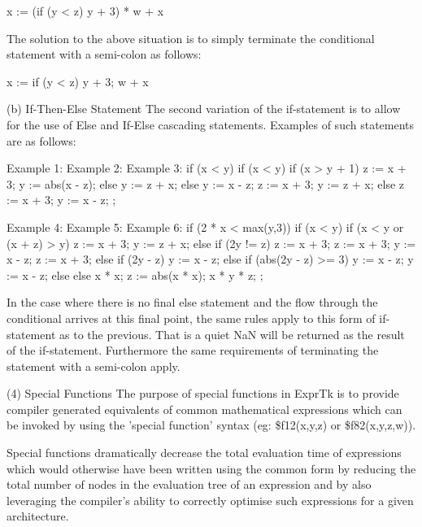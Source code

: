 x := (if (y < z) y + 3) * w + x


The  solution  to  the  above situation  is  to  simply  terminate the
conditional statement with a semi-colon as follows:

x := if (y < z) y + 3;
w + x


(b) If-Then-Else Statement
The second variation of  the if-statement is to  allow for the use  of
Else and If-Else cascading statements. Examples of such statements are
as follows:

Example 1:             Example 2:         Example 3:
if (x < y)             if (x < y)         if (x > y + 1)
z := x + 3;          {                    y := abs(x - z);
else                     y := z + x;      else
y := x - z;            z := x + 3;      {
}                    y := z + x;
else                 z := x + 3;
y := x - z;      };


Example 4:             Example 5:         Example 6:
if (2 * x < max(y,3))  if (x < y)         if (x < y or (x + z) > y)
{                        z := x + 3;      {
	y := z + x;          else if (2y != z)    z := x + 3;
	z := x + 3;          {                    y := x - z;
	}                        z := x + 3;      }
else if (2y - z)         y := x - z;      else if (abs(2y - z) >= 3)
y := x - z;          }                    y := x - z;
else               else
x * x;           {
z := abs(x * x);
x * y * z;
};


In  the case  where  there  is no  final else  statement and  the flow
through the conditional  arrives at this  final point, the  same rules
apply to this form of if-statement as to the previous. That is a quiet
NaN will be  returned as the  result of the  if-statement. Furthermore
the same requirements of  terminating the statement with  a semi-colon
apply.

(4) Special Functions
The purpose  of special  functions in  ExprTk is  to provide  compiler
generated equivalents of common mathematical expressions which can  be
invoked by  using the  'special function'  syntax (eg:  \$f12(x,y,z) or
\$f82(x,y,z,w)).

Special functions dramatically decrease  the total evaluation time  of
expressions which would otherwise  have been written using  the common
form by reducing the total number  of nodes in the evaluation tree  of
an  expression  and  by  also  leveraging  the  compiler's  ability to
correctly optimise such expressions for a given architecture.

